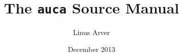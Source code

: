 \documentclass[letterpaper,twoside,12pt]{article}
\begin{document}
\title{The \texttt{auca} Source Manual}
\author{Linus Arver}
\date{December 2013}
\maketitle
\tableofcontents






\end{document}

